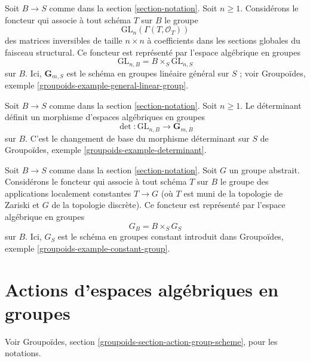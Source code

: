 \begin{example}
\label{example-general-linear-group}
Soit $B \to S$ comme dans la section \ref{section-notation}. Soit $n \geq 1$. Considérons le foncteur qui associe à tout schéma $T$ sur $B$ le groupe
$$
\text{GL}_n(\Gamma(T, \mathcal{O}_T))
$$
des matrices inversibles de taille $n \times n$ à coefficients dans les sections globales du faisceau structural. Ce foncteur est représenté par l'espace algébrique en groupes
$$
\text{GL}_{n, B} = B \times_S \text{GL}_{n, S}
$$
sur $B$. Ici, $\mathbf{G}_{m, S}$ est le schéma en groupes linéaire général sur $S$ ; voir Groupoïdes, exemple \ref{groupoids-example-general-linear-group}.
\end{example}

\begin{example}
\label{example-determinant}
Soit $B \to S$ comme dans la section \ref{section-notation}. Soit $n \geq 1$. Le déterminant définit un morphisme d'espaces algébriques en groupes
$$
\det : \text{GL}_{n, B} \longrightarrow \mathbf{G}_{m, B}
$$
sur $B$. C'est le changement de base du morphisme déterminant sur $S$ de Groupoïdes, exemple \ref{groupoids-example-determinant}.
\end{example}

\begin{example}
\label{example-constant-group}
Soit $B \to S$ comme dans la section \ref{section-notation}. Soit $G$ un groupe abstrait. Considérons le foncteur qui associe à tout schéma $T$ sur $B$ le groupe des applications localement constantes $T \to G$ (où $T$ est muni de la topologie de Zariski et $G$ de la topologie discrète). Ce foncteur est représenté par l'espace algébrique en groupes
$$
G_B = B \times_S G_S
$$
sur $B$. Ici, $G_S$ est le schéma en groupes constant introduit dans Groupoïdes, exemple \ref{groupoids-example-constant-group}.
\end{example}





\section{Actions d'espaces algébriques en groupes}
\label{section-action-group-space}

\noindent
Voir Groupoïdes, section \ref{groupoids-section-action-group-scheme}, pour les notations.

